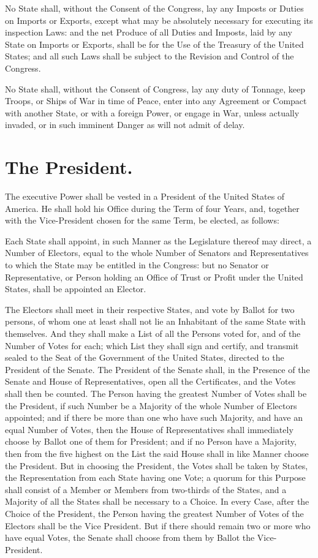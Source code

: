 \documentclass[12pt]{constitution}
\begin{document}
No State shall, without the Consent of the Congress, lay any Imposts or Duties
on Imports or Exports, except what may be absolutely necessary for executing
its inspection Laws: and the net Produce of all Duties and Imposts, laid by
any State on Imports or Exports, shall be for the Use of the Treasury of the
United States; and all such Laws shall be subject to the Revision and Control
of the Congress.

No State shall, without the Consent of Congress, lay any duty of Tonnage, keep
Troops, or Ships of War in time of Peace, enter into any Agreement or Compact
with another State, or with a foreign Power, or engage in War, unless actually
invaded, or in such imminent Danger as will not admit of delay.



\section{The President.}
The executive Power shall be vested in a President of the United States of
America. He shall hold his Office during the Term of four Years, and, together
with the Vice-President chosen for the same Term, be elected, as follows:

Each State shall appoint, in such Manner as the Legislature thereof may direct,
a Number of Electors, equal to the whole Number of Senators and Representatives
to which the State may be entitled in the Congress: but no Senator or
Representative, or Person holding an Office of Trust or Profit under the United
States, shall be appointed an Elector.

The Electors shall meet in their respective States, and vote by Ballot for two
persons, of whom one at least shall not lie an Inhabitant of the same State
with themselves. And they shall make a List of all the Persons voted for, and
of the Number of Votes for each; which List they shall sign and certify, and
transmit sealed to the Seat of the Government of the United States, directed to
the President of the Senate. The President of the Senate shall, in the Presence
of the Senate and House of Representatives, open all the Certificates, and the
Votes shall then be counted. The Person having the greatest Number of Votes
shall be the President, if such Number be a Majority of the whole Number of
Electors appointed; and if there be more than one who have such Majority, and
have an equal Number of Votes, then the House of Representatives shall
immediately choose by Ballot one of them for President; and if no Person have a
Majority, then from the five highest on the List the said House shall in like
Manner choose the President. But in choosing the President, the Votes shall be
taken by States, the Representation from each State having one Vote; a quorum
for this Purpose shall consist of a Member or Members from two-thirds of the
States, and a Majority of all the States shall be necessary to a Choice. In
every Case, after the Choice of the President, the Person having the greatest
Number of Votes of the Electors shall be the Vice President. But if there
should remain two or more who have equal Votes, the Senate shall choose from
them by Ballot the Vice-President.
\end{document}
